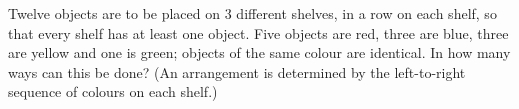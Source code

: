 Twelve objects are to be placed on $3$ different shelves, in a row on each shelf, so that every shelf has at least one object. Five objects are red, three are blue, three are yellow and one is green; objects of the same colour are identical. In how many ways can this be done? (An arrangement is determined by the left-to-right sequence of colours on each shelf.)
